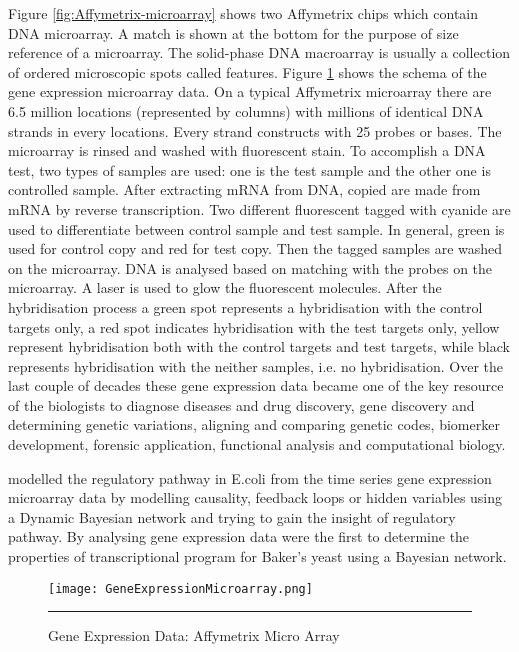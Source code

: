Figure \ref{fig:Affymetrix-microarray} shows two Affymetrix chips which contain DNA microarray. A match is shown at the bottom for the purpose of size reference of a microarray. The solid-phase DNA macroarray is usually a collection of ordered microscopic spots called features. Figure \ref{fig:Gene Expression Microarray} shows the schema of the gene expression microarray data. On a typical Affymetrix microarray there are 6.5 million locations (represented by columns) with millions of identical DNA strands in every locations. Every strand constructs with 25 probes or bases. The microarray is rinsed and washed with fluorescent stain. To accomplish a DNA test, two types of samples are used: one is the test sample and the other one is controlled sample. After extracting mRNA from DNA, copied are made from mRNA by reverse transcription. Two different fluorescent tagged with cyanide are used to differentiate between control sample and test sample. In general, green is used for control copy and red for test copy. Then the tagged samples are washed on the microarray. DNA is analysed based on matching with the probes on the microarray. A laser is used to glow the fluorescent molecules. After the hybridisation process a green spot represents a hybridisation with the control targets only, a red spot indicates hybridisation with the test targets only, yellow represent hybridisation both with the control targets and test targets, while black represents hybridisation with the neither samples, i.e. no hybridisation. Over the last couple of decades these gene expression data became one of the key resource of the biologists to diagnose diseases and drug discovery, gene discovery and determining genetic variations, aligning and comparing genetic codes, biomerker development, forensic application, functional analysis and computational biology.

\cite{Ong:2002} modelled the regulatory pathway in E.coli from the time series gene expression microarray data by modelling causality, feedback loops or hidden variables using a Dynamic Bayesian network and trying to gain the insight of regulatory pathway. By analysing gene expression data \cite{Friedman:2000} were the first to determine the properties of transcriptional program for Baker's yeast using a Bayesian network.

\begin{figure}[t]
	\centering
	\texttt{[image: GeneExpressionMicroarray.png]}
		\rule{35em}{0.5pt}
	\caption{Gene Expression Data: Affymetrix Micro Array}
	\label{fig:Gene Expression Microarray}
\end{figure}

